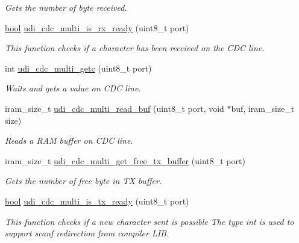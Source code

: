 \begin{DoxyCompactItemize}
\begin{DoxyCompactList}\small\item\em Gets the number of byte received. \end{DoxyCompactList}\item 
\hyperlink{group__group__xmega__utils_ga97a80ca1602ebf2303258971a2c938e2}{bool} \hyperlink{group__udi__cdc__group_ga1eea169426a593cb41125a2d0745bdd3}{udi\-\_\-cdc\-\_\-multi\-\_\-is\-\_\-rx\-\_\-ready} (uint8\-\_\-t port)
\begin{DoxyCompactList}\small\item\em This function checks if a character has been received on the C\-D\-C line. \end{DoxyCompactList}\item 
int \hyperlink{group__udi__cdc__group_ga89406b73cd57b6ac589b3663d97abd9e}{udi\-\_\-cdc\-\_\-multi\-\_\-getc} (uint8\-\_\-t port)
\begin{DoxyCompactList}\small\item\em Waits and gets a value on C\-D\-C line. \end{DoxyCompactList}\item 
iram\-\_\-size\-\_\-t \hyperlink{group__udi__cdc__group_gae7f98639f63b0f9413f64235a0dcdbf4}{udi\-\_\-cdc\-\_\-multi\-\_\-read\-\_\-buf} (uint8\-\_\-t port, void $\ast$buf, iram\-\_\-size\-\_\-t size)
\begin{DoxyCompactList}\small\item\em Reads a R\-A\-M buffer on C\-D\-C line. \end{DoxyCompactList}\item 
iram\-\_\-size\-\_\-t \hyperlink{group__udi__cdc__group_ga729e06f59cf4288e5a64ca291e9fe620}{udi\-\_\-cdc\-\_\-multi\-\_\-get\-\_\-free\-\_\-tx\-\_\-buffer} (uint8\-\_\-t port)
\begin{DoxyCompactList}\small\item\em Gets the number of free byte in T\-X buffer. \end{DoxyCompactList}\item 
\hyperlink{group__group__xmega__utils_ga97a80ca1602ebf2303258971a2c938e2}{bool} \hyperlink{group__udi__cdc__group_ga6228a9513a17dbd90d03b0dcba64bd15}{udi\-\_\-cdc\-\_\-multi\-\_\-is\-\_\-tx\-\_\-ready} (uint8\-\_\-t port)
\begin{DoxyCompactList}\small\item\em This function checks if a new character sent is possible The type int is used to support scanf redirection from compiler L\-I\-B. \end{DoxyCompactList}\item 

\end{DoxyCompactItemize}

